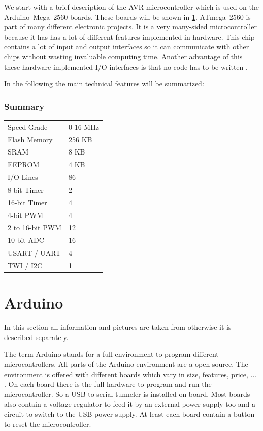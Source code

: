 We start with a brief description of the AVR microcontroller which is used on the Arduino~Mega~2560 boards.
These boards will be shown in \ref{sec:arduino}.
ATmega~2560 is part of many different electronic projects.
It is a very many-sided microcontroller because it has has a lot of different features implemented in hardware.
This chip contains a lot of input and output interfaces so it can communicate with other chips without wasting invaluable computing time.
Another advantage of this these hardware implemented I/O interfaces is that no code has to be written .

In the following the main technical features will be summarized:
\subsubsection{Summary} \label{sec:atmega2560Summary}
\begin{tabular}{ll}
Speed Grade	& 0-16 MHz	\\
Flash Memory	& 256 KB	\\
SRAM			& 8 KB	\\
EEPROM		& 4 KB	\\
I/O Lines		& 86		\\
8-bit Timer		& 2		\\
16-bit Timer	& 4		\\
4-bit PWM		& 4		\\
2 to 16-bit PWM	& 12		\\
10-bit ADC		& 16		\\
USART / UART	& 4		\\
TWI / I2C		& 1		\\
\end{tabular}


\section{Arduino} \label {sec:arduino}
In this section all information and pictures are taken from \cite{web:arduino} otherwise it is described separately.

The term Arduino stands for a full environment to program different microcontrollers.
All parts of the Arduino environment are a open source. 
The environment is offered with different boards which vary in size, features, price, ... .
On each board there is the full hardware to program and run the microcontroller.
So a USB to serial tunneler is installed on-board.
Most boards also contain a voltage regulator to feed it by an external power supply too and a circuit to switch to the USB power supply.
At least each board contain a button to reset the microcontroller.

